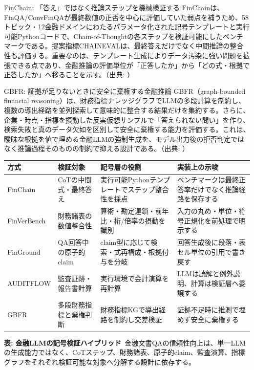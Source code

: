 \begin{casestudy}{FinChain: 「答え」ではなく推論ステップを機械検証する}
FinChainは、FinQA/ConvFinQAが最終数値の正否を中心に評価していた弱点を補うため、58トピック・12金融ドメインにわたるパラメータ化された記号テンプレートと実行可能Pythonコードで、Chain-of-Thoughtの各ステップを検証可能にしたベンチマークである。提案指標CHAINEVALは、最終答えだけでなく中間推論の整合性も評価する。重要なのは、テンプレート生成によりデータ汚染に強い問題を拡張できる点であり、金融推論の評価単位が「正答したか」から「どの式・根拠で正答したか」へ移ることを示す。（出典: \cite{x05finchain2025}）
\end{casestudy}

\begin{casestudy}{GBFR: 証拠が足りないときに安全に棄権する金融推論}
GBFR（graph-bounded financial reasoning）は、財務指標ナレッジグラフでLLMの多段計算を制約し、複数の導出経路を並列探索して意味的に整合する結果だけを集約する。さらに、企業・時点・指標を摂動した反実仮想サンプルで「答えられない問い」を作り、検索失敗と真のデータ欠如を区別して安全に棄権する能力を評価する。これは、曖昧な根拠を値で埋める金融LLMの強制生成を、モデル出力後の拒否判定ではなく推論過程そのものの制約で抑える設計である。（出典: \cite{x05gbfr2026}）
\end{casestudy}

\begin{center}
\footnotesize
\renewcommand{\arraystretch}{1.25}
\begin{tabular}{@{}p{2.8cm}p{3.2cm}p{3.4cm}p{4.0cm}@{}}
\toprule
\textbf{方式} & \textbf{検証対象} & \textbf{記号層の役割} & \textbf{実装上の示唆} \\
\midrule
FinChain \cite{x05finchain2025} & CoTの中間式・最終答え & 実行可能Pythonテンプレートでステップ整合性を採点 & ベンチマークは最終正答率だけでなく推論経路を保存する \\
FinVerBench \cite{finverbench2026} & 財務諸表の数値整合性 & 算術・勘定連鎖・前年比・桁/倍率の摂動を識別 & 入力の丸め・単位・符号正規化を前処理で明示する \\
FinGround \cite{finground2026} & QA回答中の原子的claim & claim型に応じて検索・式再構成・根拠付与を分岐 & 回答生成後に段落・表セル単位の引用で書き戻す \\
AUDITFLOW \cite{auditflow2026} & 監査証跡・報告書計算 & 実行環境で会計演算を再計算 & LLMは読解と例外説明、計算は検証層へ委譲する \\
GBFR \cite{x05gbfr2026} & 多段財務指標と棄権判断 & 財務指標KGで導出経路を制約し交差検証 & 証拠不足時に推測で埋めず安全に棄権する \\
\bottomrule
\end{tabular}
\end{center}
{\small\color{brandgray}\textbf{表: 金融LLMの記号検証ハイブリッド}\ 金融文書QAの信頼性向上は、単一LLMの生成能力ではなく、CoTステップ、財務諸表、原子的claim、監査演算、指標グラフをそれぞれ検証可能な対象へ分解する設計に依存する。}

